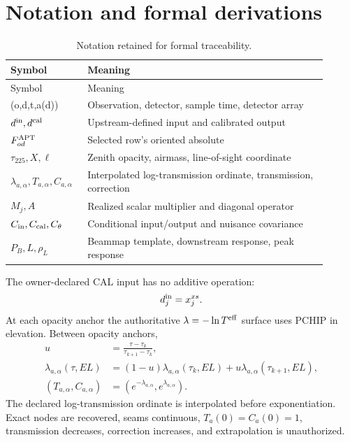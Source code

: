 \documentclass[11pt]{article}
\begin{document}
\section{Notation and formal derivations}\label{app:formal}
\begin{longtable}{L{0.20\linewidth}L{0.70\linewidth}}
\caption{Notation retained for formal traceability.}\\
\toprule Symbol & Meaning \\
\midrule\endfirsthead\toprule Symbol & Meaning \\
\midrule\endhead
(o,d,t,a(d)) & Observation, detector, sample time, detector array \\
\(d^{\rm in},d^{\rm cal}\) & Upstream-defined input and calibrated output \\
\(F^{\rm APT}_{od}\) & Selected row's oriented absolute  \\
\(\tau_{225},X,\ell\) & Zenith opacity, airmass, line-of-sight coordinate \\
\(\lambda_{a,\alpha},T_{a,\alpha},C_{a,\alpha}\) & Interpolated log-transmission ordinate, transmission, correction \\
\(M_j,A\) & Realized scalar multiplier and diagonal operator \\
\(C_{\rm in},C_{\rm cal},C_\theta\) & Conditional input/output and nuisance covariance \\
\(P_B,L,\rho_L\) & Beammap template, downstream response, peak response \\
\bottomrule\end{longtable}
The owner-declared CAL input has no additive operation:
\begin{equation}d^{\rm in}_j=x^{xs}_j.\label{eq:appendix-affine}\end{equation}
At each opacity anchor the authoritative \(\lambda=-\ln T^{\rm eff}\) surface
uses PCHIP in elevation. Between opacity anchors,
\begin{align}
u&=\frac{\tau-\tau_k}{\tau_{k+1}-\tau_k},\\
\lambda_{a,\alpha}(\tau,EL)&=(1-u)\lambda_{a,\alpha}(\tau_k,EL)
+u\lambda_{a,\alpha}(\tau_{k+1},EL),\\
(T_{a,\alpha},C_{a,\alpha})&=(e^{-\lambda_{a,\alpha}},e^{\lambda_{a,\alpha}}).
\label{eq:appendix-atmos}
\end{align}
The declared log-transmission ordinate is interpolated before exponentiation. Exact nodes are
recovered, seams continuous, \(T_a(0)=C_a(0)=1\), transmission decreases,
correction increases, and extrapolation is unauthorized.
\end{document}
